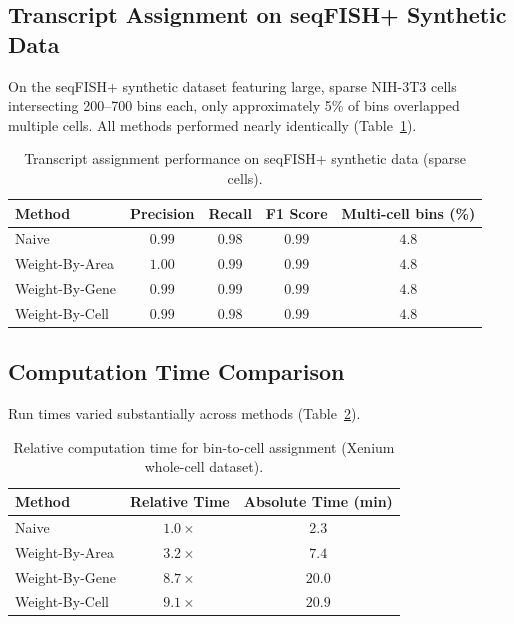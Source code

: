 \documentclass[11pt]{article}
\begin{document}
\subsection{Transcript Assignment on seqFISH+ Synthetic Data}

On the seqFISH+ synthetic dataset \citep{eng2019seqfish} featuring large, sparse NIH-3T3 cells intersecting 200--700 bins each, only approximately 5\% of bins overlapped multiple cells. All methods performed nearly identically (Table~\ref{tab:seqfish}).

\begin{table}[H]
\centering
\caption{Transcript assignment performance on seqFISH+ synthetic data (sparse cells).}
\label{tab:seqfish}
\begin{tabular}{lcccc}
\toprule
\textbf{Method} & \textbf{Precision} & \textbf{Recall} & \textbf{F1 Score} & \textbf{Multi-cell bins (\%)} \\
\midrule
Naive & $0.99$ & $0.98$ & $0.99$ & $4.8$ \\
Weight-By-Area & $\mathbf{1.00}$ & $\mathbf{0.99}$ & $\mathbf{0.99}$ & $4.8$ \\
Weight-By-Gene & $0.99$ & $0.99$ & $0.99$ & $4.8$ \\
Weight-By-Cell & $0.99$ & $0.98$ & $0.99$ & $4.8$ \\
\bottomrule
\end{tabular}
\end{table}

\subsection{Computation Time Comparison}

Run times varied substantially across methods (Table~\ref{tab:runtime}).

\begin{table}[H]
\centering
\caption{Relative computation time for bin-to-cell assignment (Xenium whole-cell dataset).}
\label{tab:runtime}
\begin{tabular}{lcc}
\toprule
\textbf{Method} & \textbf{Relative Time} & \textbf{Absolute Time (min)} \\
\midrule
Naive & $1.0\times$ & $2.3$ \\
Weight-By-Area & $3.2\times$ & $7.4$ \\
Weight-By-Gene & $8.7\times$ & $20.0$ \\
Weight-By-Cell & $9.1\times$ & $20.9$ \\
\bottomrule
\end{tabular}
\end{table}
\end{document}
